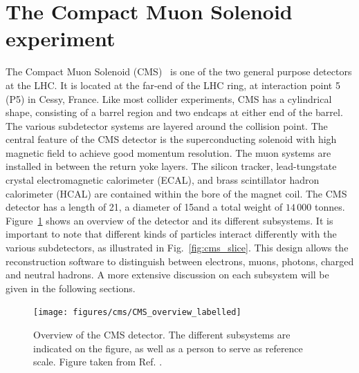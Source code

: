 \section{The Compact Muon Solenoid experiment \label{chap:CMS}}

The Compact Muon Solenoid (CMS)~\cite{Chatrchyan:2008aa,Bayatian:922757,Ball:2007zza,CMS_website} is
one of the two general purpose detectors
at the LHC. It is
located at the far-end of the LHC ring, at interaction point 5 (P5) in Cessy, France. 
Like most collider experiments, CMS has a cylindrical shape, consisting of a barrel region and two
endcaps at either end of the barrel. The various subdetector systems are layered around
the collision point. The central feature of the CMS detector is the superconducting solenoid with
high magnetic field to achieve good momentum resolution. The muon systems are installed in between
the return yoke layers. The silicon tracker, lead-tungstate crystal electromagnetic calorimeter
(ECAL), and brass scintillator hadron calorimeter (HCAL) are contained within the bore of the magnet
coil. 
The CMS detector has a length of 21\meter, a diameter of 15\meter and a total weight of $14\,000$
tonnes. 
Figure~\ref{fig:cms_overview} shows an overview of the detector and its different
subsystems. It is important to note that different kinds of particles interact differently with the
various subdetectors, as illustrated in Fig.~\ref{fig:cms_slice}. This design allows the
reconstruction software to distinguish between electrons, muons, photons, charged and neutral
hadrons. 
A more extensive discussion on each subsystem will be given in the
following sections. 

\begin{figure}[htpb]
  \centering
  \texttt{[image: figures/cms/CMS\_overview\_labelled]}
  \caption{Overview of the CMS detector. The different subsystems are indicated on the figure, as
well as a person to serve as reference scale. Figure taken from Ref. \cite{CMS_overview_labelled}.
  \label{fig:cms_overview}}
\end{figure}

